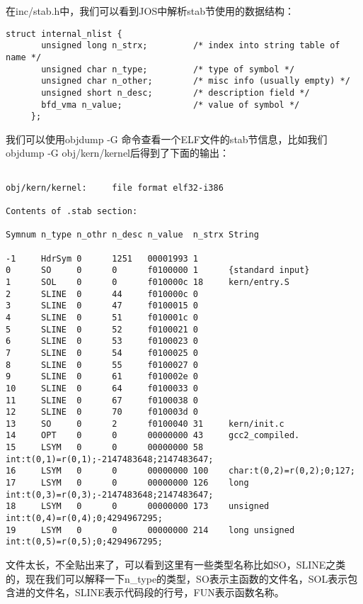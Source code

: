 \documentclass{article}
\begin{document}
\begin{CJK*}{UTF8}{gkai}
在inc/stab.h中，我们可以看到JOS中解析stab节使用的数据结构：

\begin{lstlisting}[style=ccode, firstnumber=43, title={\scriptsize \ttfamily \bfseries inc/stab.h}]
     struct internal_nlist {
       unsigned long n_strx;         /* index into string table of name */
       unsigned char n_type;         /* type of symbol */
       unsigned char n_other;        /* misc info (usually empty) */
       unsigned short n_desc;        /* description field */
       bfd_vma n_value;              /* value of symbol */
     };
\end{lstlisting}

我们可以使用objdump -G 命令查看一个ELF文件的stab节信息，比如我们objdump -G obj/kern/kernel后得到了下面的输出：


\begin{lstlisting}[style=console]

obj/kern/kernel:     file format elf32-i386

Contents of .stab section:

Symnum n_type n_othr n_desc n_value  n_strx String

-1     HdrSym 0      1251   00001993 1     
0      SO     0      0      f0100000 1      {standard input}
1      SOL    0      0      f010000c 18     kern/entry.S
2      SLINE  0      44     f010000c 0      
3      SLINE  0      47     f0100015 0      
4      SLINE  0      51     f010001c 0      
5      SLINE  0      52     f0100021 0      
6      SLINE  0      53     f0100023 0      
7      SLINE  0      54     f0100025 0      
8      SLINE  0      55     f0100027 0      
9      SLINE  0      61     f010002e 0      
10     SLINE  0      64     f0100033 0      
11     SLINE  0      67     f0100038 0      
12     SLINE  0      70     f010003d 0      
13     SO     0      2      f0100040 31     kern/init.c
14     OPT    0      0      00000000 43     gcc2_compiled.
15     LSYM   0      0      00000000 58     int:t(0,1)=r(0,1);-2147483648;2147483647;
16     LSYM   0      0      00000000 100    char:t(0,2)=r(0,2);0;127;
17     LSYM   0      0      00000000 126    long int:t(0,3)=r(0,3);-2147483648;2147483647;
18     LSYM   0      0      00000000 173    unsigned int:t(0,4)=r(0,4);0;4294967295;
19     LSYM   0      0      00000000 214    long unsigned int:t(0,5)=r(0,5);0;4294967295;
\end{lstlisting}

文件太长，不全贴出来了，可以看到这里有一些类型名称比如SO，SLINE之类的，现在我们可以解释一下n\_type的类型，SO表示主函数的文件名，SOL表示包含进的文件名，SLINE表示代码段的行号，FUN表示函数名称。


\end{CJK*}
\end{document}
